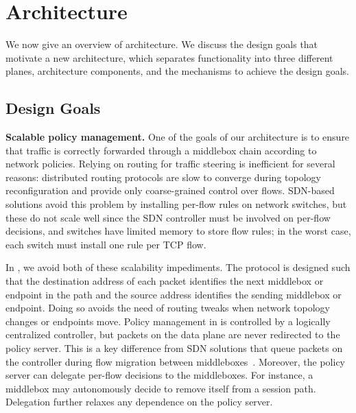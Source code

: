 \section{Architecture}\label{sec:arch}

We now  give  an overview of   \system architecture.  We  discuss  the
design goals that    motivate  a new architecture, which     separates
functionality  into three different  planes,  architecture components,
and the mechanisms to achieve the design goals.
\subsection{Design Goals}

{\bf  Scalable   policy management.}    One   of  the  goals    of our
architecture is to ensure  that traffic is correctly forwarded through
a  middlebox chain according to network  policies.  Relying on routing
for traffic steering  is inefficient for  several reasons: distributed
routing protocols are slow to converge during topology reconfiguration
and   provide only  coarse-grained   control  over  flows.   SDN-based
solutions  avoid this problem  by installing per-flow rules on network
switches, but these do not scale well since the SDN controller must be
involved  on per-flow decisions, and switches  have  limited memory to
store flow rules; in the worst case, each switch must install one rule
per TCP flow.

In \system,    we avoid both of    these scalability  impediments. The
protocol is designed such that the destination  address of each packet
identifies the next middlebox  or endpoint in  the path and the source
address identifies the sending  middlebox or endpoint. Doing so avoids
the need of routing tweaks  when network topology changes or endpoints
move.    Policy  management in \system  is   controlled by a logically
centralized controller,  but  packets  on the   data  plane are  never
redirected  to the policy server.   This is a  key difference from SDN
solutions  that queue packets  on the controller during flow migration
between middleboxes~\cite{OpenNF}.   Moreover, the  policy  server can
delegate per-flow  decisions   to the middleboxes.   For   instance, a
middlebox  may autonomously  decide to remove  itself  from  a session
path. Delegation further relaxes any dependence on the policy server.

